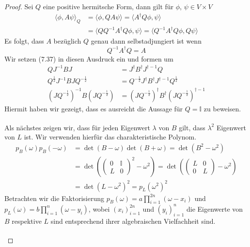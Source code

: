 \documentclass[11pt,a4paper,leqno]{report}
\numberwithin{equation}{chapter}
\begin{document}
\begin{proof}
	Sei $Q$ eine positive hermitsche Form, dann gilt f\"ur $\phi$, $\psi\in V\times V$
	\begin{align*}
	\langle\phi, A\psi\rangle_Q &= \langle\phi, QA\psi\rangle = \langle A^\dagger Q\phi, \psi\rangle\\&=\langle QQ^{-1}A^\dagger Q\phi, \psi\rangle=\langle Q^{-1}A^\dagger Q\phi, Q\psi\rangle	\end{align*}
Es folgt, dass $A$ bez\"uglich $Q$ genau dann selbstadjungiert ist wenn
\begin{equation*}
	Q^{-1}A^\dagger Q = A
\end{equation*}
Wir setzen (7.37) in diesen Ausdruck ein und formen um
\begin{align*}
	QJ^{-1}BJ&=J^\dagger B^\dagger J^{\dagger-1}Q\\
	Q^{\frac{1}{2}}J^{-1}BJQ^{-\frac{1}{2}}&=Q^{-\frac{1}{2}}J^\dagger B^\dagger J^{\dagger-1}Q^{\frac{1}{2}}\\
	(JQ^{-\frac{1}{2}})^{-1}B(JQ^{-\frac{1}{2}})&=
	(JQ^{-\frac{1}{2}})^\dagger B^\dagger(JQ^{-\frac{1}{2}})^{\dagger-1}
\end{align*}
Hiermit haben wir gezeigt, dass es ausreicht die Aussage f\"ur $Q=\mathbb{I}$ zu beweisen.\\
\\
Als n\"achstes zeigen wir, dass f\"ur jeden Eigenwert $\lambda$ von $B$ gilt, dass $\lambda^2$ Eigenwert von $L$ ist. Wir verwenden hierf\"ur das charakteristische Polynom.
\begin{align*}
	p_{B}(\omega)p_{B}(-\omega)&= \det(B-\omega)\det(B+\omega)=\det(B^2-\omega^2)\\
	&=\det(\begin{pmatrix}
		0 & \mathbb{I} \\ 
		L & 0
	\end{pmatrix}^2-\omega^2)=\det(\begin{pmatrix}
	L & 0 \\ 
	0 & L
\end{pmatrix}-\omega^2)\\
&= \det(L-\omega^2)^2=p_{L}(\omega^2)^2
\end{align*}
Betrachten wir die Faktorisierung $p_{B}(\omega)=a\prod_{i=1}^{2n}(\omega-x_i)$ und $p_{L}(\omega)=b\prod_{i=1}^n(\omega-y_i)$, wobei $(x_i)_{i=1}^{2n}$ und $(y_i)_{i=1}^n$ die Eigenwerte von $B$ respektive $L$ sind entsprechend ihrer algebraischen Vielfachheit sind.\\
\\

\end{proof}
\end{document}
